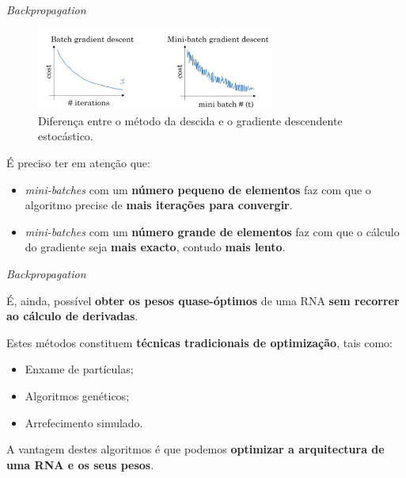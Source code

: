 \begin{frame}{\textit{Backpropagation} \cont}
    
    \begin{figure}
        \centering
        \includegraphics[width=0.7\textwidth]{img/grad_descent.png}
        \caption{Diferença entre o método da descida e o gradiente descendente estocástico.}
    \end{figure}
    
    \pauseskip
    
    É preciso ter em atenção que:
    \begin{itemize}
        \item \textit{mini-batches} com um \textbf{número pequeno de elementos} faz com que o algoritmo precise de \textbf{mais iterações para convergir}.
        \medskip
        \item \textit{mini-batches} com um \textbf{número grande de elementos} faz com que o cálculo do gradiente seja \textbf{mais exacto}, contudo \textbf{mais lento}.
    \end{itemize}
    
\end{frame}

\begin{frame}{\textit{Backpropagation} \cont}
    
    É, ainda, possível \textbf{obter os pesos quase-óptimos} de uma RNA \textbf{sem recorrer ao cálculo de derivadas}.
    
    \pauseskip
    
    Estes métodos constituem \textbf{técnicas tradicionais de optimização}, tais como:
    \begin{itemize}
        \item Enxame de partículas;
        \medskip
        \item Algoritmos genéticos;
        \medskip
        \item Arrefecimento simulado.
    \end{itemize}

    \pauseskip
    
    A vantagem destes algoritmos é que podemos \textbf{optimizar a arquitectura de uma RNA e os seus pesos}.
    
    
\end{frame}

